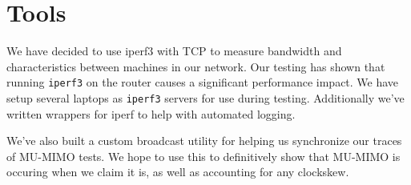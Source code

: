 \section{Tools}

We have decided to use iperf3 with TCP to measure bandwidth and
characteristics between machines in our network. Our testing has shown
that running \texttt{iperf3} on the router causes a significant
performance impact. We have setup several laptops as \texttt{iperf3}
servers for use during testing. Additionally we've written wrappers
for iperf to help with automated logging.

We've also built a custom broadcast utility for helping us synchronize
our traces of MU-MIMO tests. We hope to use this to definitively show
that MU-MIMO is occuring when we claim it is, as well as accounting
for any clockskew.
